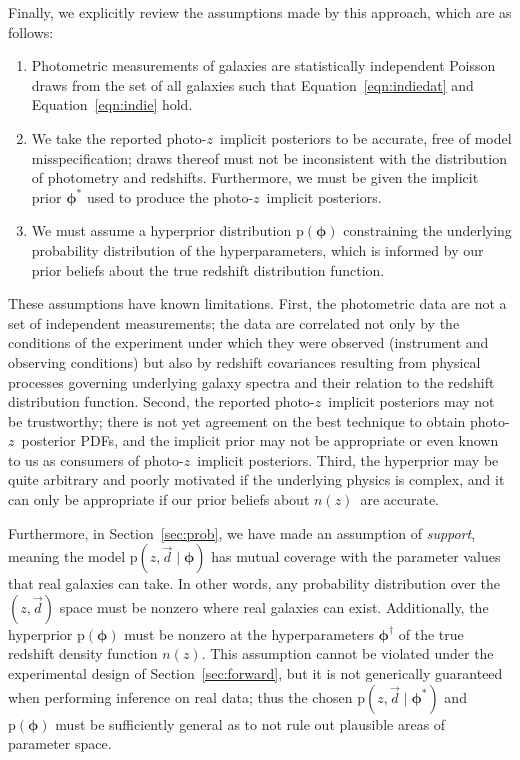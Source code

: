 \documentclass[iop]{emulateapj}
\newcommand{\Eq}[1]{Equation~\ref{#1}}
\newcommand{\data}{\ensuremath{\vec{d}}}%
\newcommand{\pr}[1]{\ensuremath{\mathrm{p}(#1)}}%
\newcommand{\gvn}{\mid}%
\newcommand{\pz}{photo-$z$}
\newcommand{\pzpdf}{\pz\ posterior PDF}%
\newcommand{\pzip}{\pz\ implicit posterior}
\newcommand{\nz}{$n(z)$}
\newcommand{\bvec}[1]{\ensuremath{\boldsymbol{#1}}}%
\newcommand{\ndphi}{\bvec{\phi}}
\begin{document}
Finally, we explicitly review the assumptions made by this approach, which are as follows:
\begin{enumerate}
	\item Photometric measurements of galaxies are statistically independent Poisson draws from the set of all galaxies such that \Eq{eqn:indiedat} and \Eq{eqn:indie} hold.
	\item We take the reported \pzip s to be accurate, free of model misspecification; 
	draws thereof must not be inconsistent with the distribution of photometry and redshifts.
	Furthermore, we must be given the implicit prior $\ndphi^{*}$ used to produce the \pzip s.
	\item We must assume a hyperprior distribution $\pr{\ndphi}$ constraining the underlying probability distribution of the hyperparameters, which is informed by our prior beliefs about the true redshift distribution function.
\end{enumerate}

These assumptions have known limitations.  
First, the photometric data are not a set of independent measurements; 
the data are correlated not only by the conditions of the experiment under which they were observed (instrument and observing conditions) but also by redshift covariances resulting from physical processes governing underlying galaxy spectra and their relation to the redshift distribution function.
Second, the reported \pzip s may not be trustworthy; 
there is not yet agreement on the best technique to obtain \pzpdf s, and the implicit prior may not be appropriate or even known to us as consumers of \pzip s.  
Third, the hyperprior may be quite arbitrary and poorly motivated if the underlying physics is complex, and it can only be appropriate if our prior beliefs about \nz\ are accurate.

Furthermore, in Section~\ref{sec:prob}, we have made an assumption of \textit{support}, meaning the model $\pr{z, \data \gvn \ndphi}$ has mutual coverage with the parameter values that real galaxies can take.  
In other words, any probability distribution over the $(z, \data)$ space must be nonzero where real galaxies can exist. 
Additionally, the hyperprior $\pr{\ndphi}$ must be nonzero at the hyperparameters $\ndphi^{\dagger}$ of the true redshift density function \nz.
This assumption cannot be violated under the experimental design of Section~\ref{sec:forward}, but it is not generically guaranteed when performing inference on real data;
thus the chosen $\pr{z, \data \gvn \ndphi^{*}}$ and $\pr{\ndphi}$ must be sufficiently general as to not rule out plausible areas of parameter space.
\end{document}
